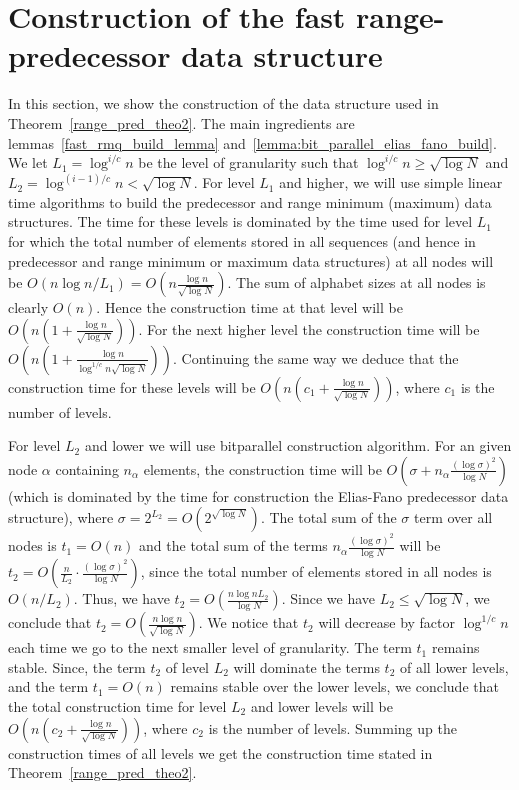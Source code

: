 \documentclass[11pt,runningheads]{llncs}
\begin{document}
\section{Construction of the fast range-predecessor data structure}
In this section, we show the construction of the data structure used in Theorem~\ref{range_pred_theo2}. 
The main ingredients are lemmas~\ref{fast_rmq_build_lemma} and~\ref{lemma:bit_parallel_elias_fano_build}. 
We let $L_1=\log^{i/c}n$ be the level of granularity  such that $\log^{i/c}n\geq\sqrt{\log N}$ and 
$L_2=\log^{(i-1)/c}n<\sqrt{\log N}$. For level $L_1$ and higher, we will use simple linear time 
algorithms to build the predecessor and range minimum (maximum) data structures. The time for these levels 
is dominated by the time used for level $L_1$ for which the total number of elements stored in all sequences (and hence in predecessor and range minimum or maximum data structures) at all nodes will be $O(n\log n/L_1)=O(n\frac{\log n}{\sqrt{\log N}})$. The sum of alphabet sizes at all nodes is clearly $O(n)$. Hence the construction time at that level will be $O(n(1+\frac{\log n}{\sqrt{\log N}}))$. For the next higher level the construction time will be $O(n(1+\frac{\log n}{\log^{1/c}n\sqrt{\log N}}))$. Continuing the same way we deduce that the construction time for these levels will be $O(n(c_1+\frac{\log n}{\sqrt{\log N}}))$, 
where $c_1$ is the number of levels. 

For level $L_2$ and lower we will use bitparallel construction algorithm. For an given node $\alpha$ containing 
$n_\alpha$ elements, the construction time will be $O(\sigma+n_\alpha\frac{(\log\sigma)^2}{\log N})$ (which is dominated by the time for construction the Elias-Fano predecessor data structure), where $\sigma=2^{L_2}=O(2^{\sqrt{\log N}})$. The total sum of the $\sigma$ term over all nodes is $t_1=O(n)$ and the total sum of the terms 
$n_\alpha\frac{(\log\sigma)^2}{\log N}$ will be $t_2=O(\frac{n}{L_2}\cdot\frac{(\log\sigma)^2}{\log N})$, since the total
number of elements stored in all nodes is $O(n/L_2)$. Thus, we have $t_2=O(\frac{n\log nL_2}{\log N})$. Since 
we have $L_2\leq \sqrt{\log N}$, we conclude that $t_2=O(\frac{n\log n}{\sqrt{\log N}})$. We notice that $t_2$ will decrease 
by factor $\log^{1/c}n$ each time we go to the next smaller level of granularity. The term $t_1$ remains stable. Since, the term $t_2$ of level $L_2$ will dominate the terms $t_2$ of all lower levels, and the term $t_1=O(n)$ remains stable over the lower levels, we conclude that the total construction 
time for level $L_2$ and lower levels will be $O(n(c_2+\frac{\log n}{\sqrt{\log N}}))$, where $c_2$ is the number of levels. 
Summing up the construction times of all levels we get the construction time stated in Theorem~\ref{range_pred_theo2}.
\end{document}
